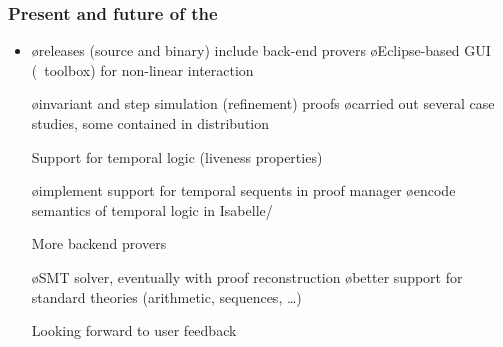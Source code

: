 \documentclass[fleqn]{beamer}
\begin{document}
\begin{frame}
  \frametitle{Present and \alert{future} of the \tlaps}

  \begin{itemize}
  \item {}

    \begin{itemize}
    \o releases (source and binary) include back-end provers
    \o Eclipse-based GUI (\tlaplus\ toolbox) for non-linear interaction
    \end{itemize}

  \oo {}

    \begin{itemize}
    \o invariant and step simulation (refinement) proofs
    \o carried out several case studies, some contained in distribution
    \end{itemize}

  \oo \alert{Support for temporal logic (liveness properties)}

    \begin{itemize}
    \o implement support for temporal sequents in proof manager
    \o encode semantics of temporal logic in Isabelle/\tlaplus
    \end{itemize}

  \oo \alert{More backend provers}

    \begin{itemize}
    \o SMT solver, eventually with proof reconstruction
    \o better support for standard theories (arithmetic, sequences, \ldots)
    \end{itemize}

  \oo \alert{Looking forward to user feedback}
  \end{itemize}
\end{frame}
\end{document}
